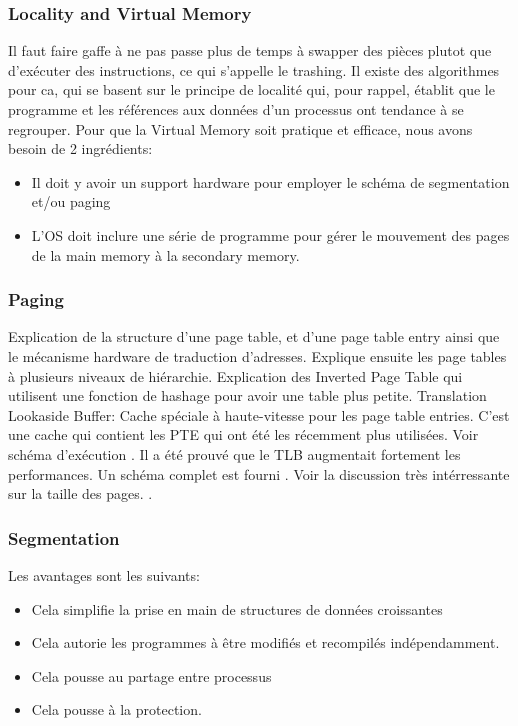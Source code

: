 \subsubsection{Locality and Virtual Memory}
Il faut faire gaffe à ne pas passe plus de temps à swapper des pièces plutot que d'exécuter des instructions, ce qui s'appelle le trashing.
Il existe des algorithmes pour ca, qui se basent sur le principe de localité qui, pour rappel, établit que le programme et les références aux données d'un processus ont tendance à se regrouper.
Pour que la Virtual Memory soit pratique et efficace, nous avons besoin de 2 ingrédients:
\begin{itemize}
  \item Il doit y avoir un support hardware pour employer le schéma de segmentation et/ou paging
  \item L'OS doit inclure une série de programme pour gérer le mouvement des pages de la main memory à la secondary memory.
\end{itemize}

\subsubsection{Paging}
Explication de la structure d'une page table, et d'une page table entry ainsi que le mécanisme hardware de traduction d'adresses.
Explique ensuite les page tables à plusieurs niveaux de hiérarchie.
Explication des Inverted Page Table qui utilisent une fonction de hashage pour avoir une table plus petite.
Translation Lookaside Buffer: Cache spéciale à haute-vitesse pour les page table entries.
C'est une cache qui contient les PTE qui ont été les récemment plus utilisées.
Voir schéma d'exécution \cite[p.~371]{stallings}.
Il a été prouvé que le TLB augmentait fortement les performances.
Un schéma complet est fourni \cite[p.~372-373]{stallings}.
Voir la discussion très intérressante sur la taille des pages.
\cite[p.~374-375]{stallings}.

\subsubsection{Segmentation}
Les avantages sont les suivants:
\begin{itemize}
  \item Cela simplifie la prise en main de structures de données croissantes
  \item Cela autorie les programmes à être modifiés et recompilés indépendamment.
  \item Cela pousse au partage entre processus
  \item Cela pousse à la protection.
\end{itemize}

